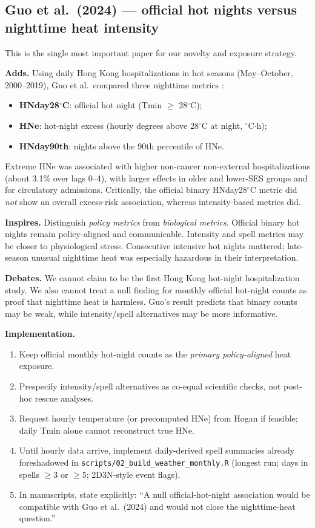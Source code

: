 \documentclass[11pt]{article}
\newcommand{\adds}{\textcolor{green!40!black}{\textbf{Adds.}}}
\newcommand{\inspires}{\textcolor{blue!55!black}{\textbf{Inspires.}}}
\newcommand{\debates}{\textcolor{orange!70!black}{\textbf{Debates.}}}
\newcommand{\impl}{\textcolor{purple!55!black}{\textbf{Implementation.}}}
\begin{document}
\subsection{Guo et al.\ (2024) --- official hot nights versus nighttime heat intensity}

This is the single most important paper for our novelty and exposure strategy.

\adds{} Using daily Hong Kong hospitalizations in hot seasons (May--October,
2000--2019), Guo et al.\ compared three nighttime metrics
\citep{guo2024hotnights}:
\begin{itemize}
  \item \textbf{HNday28$^\circ$C}: official hot night (Tmin $\ge$ 28$^\circ$C);
  \item \textbf{HNe}: hot-night excess (hourly degrees above 28$^\circ$C at night,
        $^\circ$C$\cdot$h);
  \item \textbf{HNday90th}: nights above the 90th percentile of HNe.
\end{itemize}
Extreme HNe was associated with higher non-cancer non-external hospitalizations
(about 3.1\% over lags 0--4), with larger effects in older and lower-SES groups and
for circulatory admissions. Critically, the official binary HNday28$^\circ$C metric
did \emph{not} show an overall excess-risk association, whereas intensity-based
metrics did.

\inspires{} Distinguish \emph{policy metrics} from \emph{biological metrics}.
Official binary hot nights remain policy-aligned and communicable. Intensity and
spell metrics may be closer to physiological stress. Consecutive intensive hot
nights mattered; late-season unusual nighttime heat was especially hazardous in
their interpretation.

\debates{} We cannot claim to be the first Hong Kong hot-night hospitalization
study. We also cannot treat a null finding for monthly official hot-night counts
as proof that nighttime heat is harmless. Guo's result predicts that binary counts
may be weak, while intensity/spell alternatives may be more informative.

\impl{}
\begin{enumerate}
  \item Keep official monthly hot-night counts as the \emph{primary policy-aligned}
        heat exposure.
  \item Prespecify intensity/spell alternatives as co-equal scientific checks, not
        post-hoc rescue analyses.
  \item Request hourly temperature (or precomputed HNe) from Hogan if feasible;
        daily Tmin alone cannot reconstruct true HNe.
  \item Until hourly data arrive, implement daily-derived spell summaries already
        foreshadowed in \texttt{scripts/02\_build\_weather\_monthly.R}
        (longest run; days in spells $\ge$3 or $\ge$5; 2D3N-style event flags).
  \item In manuscripts, state explicitly: ``A null official-hot-night association
        would be compatible with Guo et al.\ (2024) and would not close the
        nighttime-heat question.''
\end{enumerate}
\end{document}
